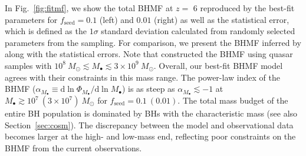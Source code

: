 \documentclass[twocolumn, twocolappendix]{aastex63}
\newcommand{\Msun}{M_\odot}
\newcommand{\Mbh}{M_\bullet}
\newcommand{\fseed}{f_\mathrm{seed}}
\newcommand{\D}{\mathrm{d}}
\begin{document}
\begin{CJK*}{UTF8}{gbsn}
In Fig.~\ref{fig:fitmf}, we show the total BHMF at $z=$ 6 reproduced by the best-fit parameters for 
$\fseed = 0.1$ (left) and $0.01$ (right) as well as the statistical error, 
which is defined as the $1\sigma$ standard deviation calculated from randomly selected parameters from the sampling.
For comparison, we present the BHMF inferred by  along with the statistical errors.
Note that  constructed the BHMF using quasar samples with 
$10^8~\Msun \lesssim \Mbh \lesssim 3\times 10^9~\Msun$.
Overall, our best-fit BHMF model agrees with their constraints in this mass range.
The power-law index of the BHMF ($\alpha_{M_\bullet} \equiv \D \ln \Phi_{M_\bullet}/\D \ln M_\bullet$) is as steep as $\alpha_{M_\bullet}\lesssim -1$
at $M_\bullet \gtrsim 10^7~(3\times 10^7)~\Msun$ for $\fseed = 0.1 ~(0.01)$.
The total mass budget of the entire BH population is dominated by BHs with the characteristic mass (see also Section~\ref{sec:cosm}). 
The discrepancy between the model and observational data becomes larger at the high- and low-mass end,
reflecting poor constraints on the BHMF from the current observations.



\end{CJK*}
\end{document}
